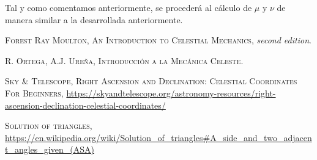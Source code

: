 \documentclass[11pt]{article}
\begin{document}
Tal y como comentamos anteriormente, se procederá al cálculo de $\mu$ y $\nu$ de manera similar a la desarrollada anteriormente.\\


\newpage

\begin{thebibliography}{99}
 \textsc{Forest Ray Moulton}, \textsc{An Introduction to Celestial Mechanics}, \textit{second edition}.

 \textsc{R. Ortega, A.J. Ureña}, \textsc{Introducción a la Mecánica Celeste}.

 \textsc{Sky \& Telescope}, \textsc{Right Ascension and Declination: Celestial Coordinates For Beginners}, \url{https://skyandtelescope.org/astronomy-resources/right-ascension-declination-celestial-coordinates/}

 \textsc{Solution of triangles}, \url{https://en.wikipedia.org/wiki/Solution_of_triangles#A_side_and_two_adjacent_angles_given_(ASA)}

\end{thebibliography}
\end{document}
